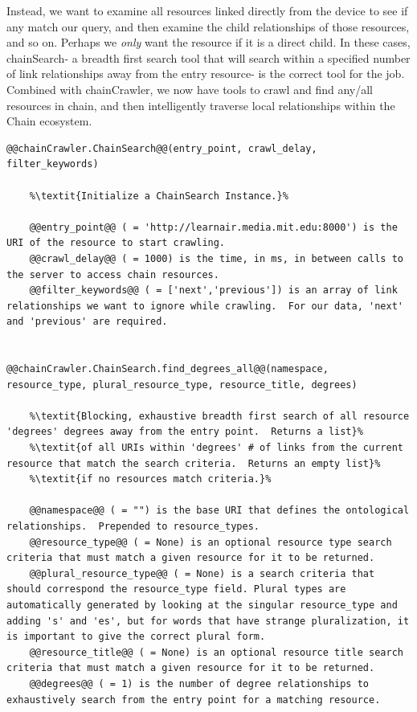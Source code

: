 Instead, we want to examine all resources linked directly from the device to see if any match our query, and then examine the child relationships of those resources, and so on.  Perhaps we \textit{only} want the resource if it is a direct child.  In these cases, chainSearch- a breadth first search tool that will search within a specified number of link relationships away from the entry resource- is the correct tool for the job.  Combined with chainCrawler, we now have tools to crawl and find any/all resources in chain, and then intelligently traverse local relationships within the Chain ecosystem.      


\begin{lstlisting}[style=codedef]
@@chainCrawler.ChainSearch@@(entry_point, crawl_delay, filter_keywords)
	
	%\textit{Initialize a ChainSearch Instance.}%

	@@entry_point@@ ( = 'http://learnair.media.mit.edu:8000') is the URI of the resource to start crawling.
	@@crawl_delay@@ ( = 1000) is the time, in ms, in between calls to the server to access chain resources.
	@@filter_keywords@@ ( = ['next','previous']) is an array of link relationships we want to ignore while crawling.  For our data, 'next' and 'previous' are required.


@@chainCrawler.ChainSearch.find_degrees_all@@(namespace, resource_type, plural_resource_type, resource_title, degrees)
	
	%\textit{Blocking, exhaustive breadth first search of all resource 'degrees' degrees away from the entry point.  Returns a list}%
	%\textit{of all URIs within 'degrees' # of links from the current resource that match the search criteria.  Returns an empty list}%
	%\textit{if no resources match criteria.}%

	@@namespace@@ ( = "") is the base URI that defines the ontological relationships.  Prepended to resource_types. 
	@@resource_type@@ ( = None) is an optional resource type search criteria that must match a given resource for it to be returned.
	@@plural_resource_type@@ ( = None) is a search criteria that should correspond the resource_type field. Plural types are automatically generated by looking at the singular resource_type and adding 's' and 'es', but for words that have strange pluralization, it is important to give the correct plural form. 
	@@resource_title@@ ( = None) is an optional resource title search criteria that must match a given resource for it to be returned.
	@@degrees@@ ( = 1) is the number of degree relationships to exhaustively search from the entry point for a matching resource.



\end{lstlisting}

